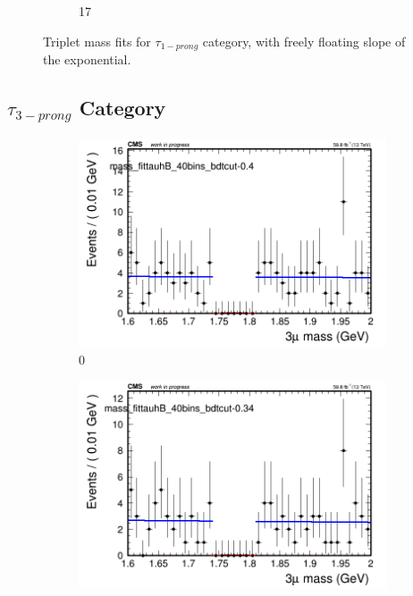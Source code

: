 \begin{figure}[h!]
\begin{subfigure}{0.2\textwidth}
        \caption{17}
    \end{subfigure}
    \caption{Triplet mass fits for $\tau_{1-prong}$ category, with freely floating slope of the exponential.}
    \label{fig:unfixed_tauha}
\end{figure}


\newpage

\subsection{$\tau_{3-prong}$ Category}
\label{sec:tauhb}

\begin{figure}[h!]
    \centering
    \begin{subfigure}{0.2\textwidth}
        \includegraphics[width=\textwidth]{unfixed_exp/plots/tauhB/massfit_tauhB_40bins_bdtcut-0.4.png}
        \caption{0}
    \end{subfigure}
    \begin{subfigure}{0.2\textwidth}
        \includegraphics[width=\textwidth]{unfixed_exp/plots/tauhB/massfit_tauhB_40bins_bdtcut-0.34.png}

\end{subfigure}
\end{figure}
